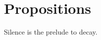 \documentclass[a]{subfiles}
\begin{document}
\chapter{Propositions}
\begin{parsec}%
Silence is the prelude to decay.
\end{parsec}
\end{document}
